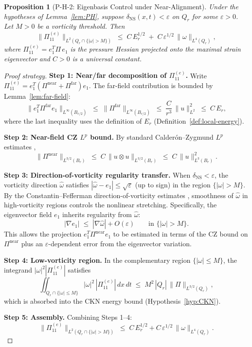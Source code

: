 \documentclass[11pt]{article}
\newtheorem{proposition}[lemma]{Proposition}
\theoremstyle{definition}
\begin{document}
\begin{proposition}[P-H-2: Eigenbasis Control under Near-Alignment]
\label{prop:PH2}
Under the hypotheses of Lemma~\ref{lem:PH}, suppose $\delta_{\mathrm{NS}}(x,t) < \varepsilon$ on $Q_r$ for some $\varepsilon > 0$.
Let $M > 0$ be a vorticity threshold.  Then
\[
  \|\Pi_{11}^{(e)}\|_{L^2(Q_r \cap \{|\omega| > M\})}
  \;\leq\;
  C\, E_r^{1/2} \;+\; C\, \varepsilon^{1/2}\, \|\omega\|_{L^4(Q_r)},
\]
where $\Pi_{11}^{(e)} = e_1^T \Pi\, e_1$ is the pressure Hessian projected onto the maximal strain eigenvector and $C > 0$ is a universal constant.
\end{proposition}

\begin{proof}[Proof strategy]
\textbf{Step 1: Near/far decomposition of $\Pi_{11}^{(e)}$.}\;
Write $\Pi_{11}^{(e)} = e_1^T(\Pi^{\mathrm{near}} + \Pi^{\mathrm{far}})e_1$.
The far-field contribution is bounded by Lemma~\ref{lem:far-field}:
\[
  \|e_1^T \Pi^{\mathrm{far}} e_1\|_{L^\infty(B_{r/2})}
  \;\leq\;
  \|\Pi^{\mathrm{far}}\|_{L^\infty(B_{r/2})}
  \;\leq\;
  \frac{C}{r^3}\,\|u\|_{L^2}^2
  \;\leq\;
  C\, E_r,
\]
where the last inequality uses the definition of $E_r$ (Definition~\ref{def:local-energy}).

\textbf{Step 2: Near-field CZ $L^p$ bound.}\;
By standard Calder\'on--Zygmund $L^p$ estimates \cite{Stein},
\[
  \|\Pi^{\mathrm{near}}\|_{L^{3/2}(B_r)}
  \;\leq\;
  C\, \|u \otimes u\|_{L^{3/2}(B_r)}
  \;\leq\;
  C\, \|u\|_{L^3(B_r)}^2.
\]

\textbf{Step 3: Direction-of-vorticity regularity transfer.}\;
When $\delta_{\mathrm{NS}} < \varepsilon$, the vorticity direction $\hat{\omega}$ satisfies
$|\hat{\omega} - e_1| \leq \sqrt{\varepsilon}$ (up to sign) in the region $\{|\omega| > M\}$.
By the Constantin--Fefferman direction-of-vorticity estimates \cite{CF},
smoothness of $\hat{\omega}$ in high-vorticity regions controls the nonlinear stretching.
Specifically, the eigenvector field $e_1$ inherits regularity from $\hat{\omega}$:
\[
  |\nabla e_1| \;\leq\; |\nabla \hat{\omega}| + O(\varepsilon)
  \qquad \text{in } \{|\omega| > M\}.
\]
This allows the projection $e_1^T \Pi^{\mathrm{near}} e_1$ to be estimated in terms of the
CZ bound on $\Pi^{\mathrm{near}}$ plus an $\varepsilon$-dependent error from the eigenvector variation.

\textbf{Step 4: Low-vorticity region.}\;
In the complementary region $\{|\omega| \leq M\}$,
the integrand $|\omega|^2 |\Pi_{11}^{(e)}|$ satisfies
\[
  \iint_{Q_r \cap \{|\omega| \leq M\}} |\omega|^2\, |\Pi_{11}^{(e)}|\, dx\, dt
  \;\leq\;
  M^2\, |Q_r|\, \|\Pi\|_{L^{3/2}(Q_r)},
\]
which is absorbed into the CKN energy bound (Hypothesis~\ref{hyp:CKN}).

\textbf{Step 5: Assembly.}\;
Combining Steps 1--4:
\[
  \|\Pi_{11}^{(e)}\|_{L^2(Q_r \cap \{|\omega|>M\})}
  \;\leq\;
  C\, E_r^{1/2} + C\, \varepsilon^{1/2}\, \|\omega\|_{L^4(Q_r)}.
\]
\end{proof}
\end{document}
